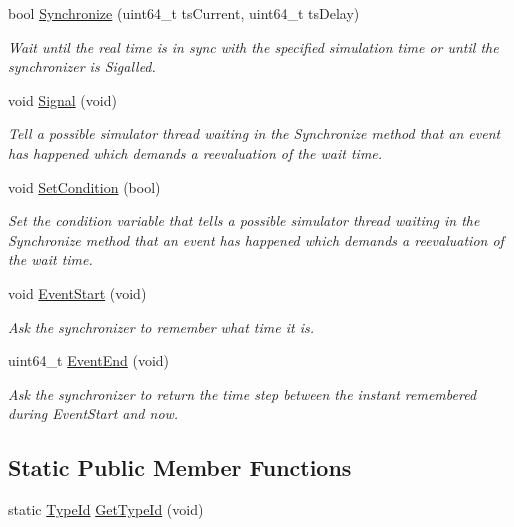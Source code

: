 \begin{DoxyCompactItemize}
bool \hyperlink{classns3_1_1Synchronizer_ae2884d39fd94ac636484d1a119cabab9}{Synchronize} (uint64\+\_\+t ts\+Current, uint64\+\_\+t ts\+Delay)
\begin{DoxyCompactList}\small\item\em Wait until the real time is in sync with the specified simulation time or until the synchronizer is Sigalled. \end{DoxyCompactList}\item 
void \hyperlink{classns3_1_1Synchronizer_aab6e196cea48f4c7c0b424a1d6b8e12c}{Signal} (void)
\begin{DoxyCompactList}\small\item\em Tell a possible simulator thread waiting in the Synchronize method that an event has happened which demands a reevaluation of the wait time. \end{DoxyCompactList}\item 
void \hyperlink{classns3_1_1Synchronizer_a6a3799d58f2f3a966fc4c802fcfe8082}{Set\+Condition} (bool)
\begin{DoxyCompactList}\small\item\em Set the condition variable that tells a possible simulator thread waiting in the Synchronize method that an event has happened which demands a reevaluation of the wait time. \end{DoxyCompactList}\item 
void \hyperlink{classns3_1_1Synchronizer_a2f2a24e95fe00fe08a2686467c2fdd66}{Event\+Start} (void)
\begin{DoxyCompactList}\small\item\em Ask the synchronizer to remember what time it is. \end{DoxyCompactList}\item 
uint64\+\_\+t \hyperlink{classns3_1_1Synchronizer_a2260b7a21248f210e9e99bfbc37ca255}{Event\+End} (void)
\begin{DoxyCompactList}\small\item\em Ask the synchronizer to return the time step between the instant remembered during Event\+Start and now. \end{DoxyCompactList}\end{DoxyCompactItemize}
\subsection*{Static Public Member Functions}
\begin{DoxyCompactItemize}
\item 
static \hyperlink{classns3_1_1TypeId}{Type\+Id} \hyperlink{classns3_1_1Synchronizer_ab73b383bf8b6a00e0df1da6689a8fb5b}{Get\+Type\+Id} (void)
\end{DoxyCompactItemize}

